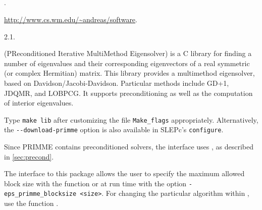 \subsection*{\underline{\primme}}
	\begin{description}
	\setlength{\itemsep}{0pt}
	\item[References.]\citep{Stathopoulos:2010:PMS}.
	\item[Website.] \url{http://www.cs.wm.edu/~andreas/software}.
	\item[Version.] 2.1.
	\item[Summary.] \primme (PReconditioned Iterative MultiMethod Eigensolver) is a C library for finding a number of eigenvalues and their corresponding eigenvectors of a real symmetric (or complex Hermitian) matrix. This library provides a multimethod eigensolver, based on Davidson/Jacobi-Davidson. Particular methods include GD+1, JDQMR, and LOBPCG. It supports preconditioning as well as the computation of interior eigenvalues.
	\item[Installation.] Type \texttt{make lib} after customizing the file \texttt{Make\_flags} appropriately. Alternatively, the \texttt{-{}-download-primme} option is also available in SLEPc's \texttt{configure}.
	\item[Specific options.] Since PRIMME contains preconditioned solvers, the \slepc interface uses , as described in \ref{sec:precond}.

The \slepc interface to this package allows the user to specify the maximum allowed block size with the function  or at run time with the option \Verb!-eps_primme_blocksize <size>!.
For changing the particular algorithm within \primme, use the function .
	\end{description}


